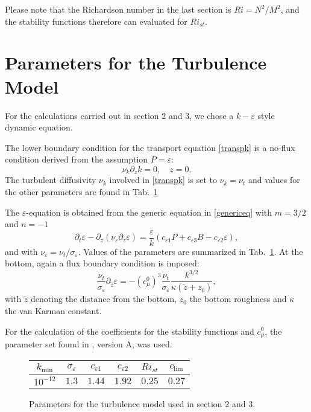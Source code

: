Please note that the Richardson number in the last section is $Ri = N^2 \slash 
M^2$, and the stability functions therefore can evaluated for $Ri_{st}$.

\section{Parameters for the Turbulence Model}

For the calculations carried out in section 2 and 3, we chose a $k-\varepsilon$ 
style dynamic equation.

The lower boundary condition for 
the transport equation \eqref{transpk} is a no-flux condition derived from the 
assumption $P=\varepsilon$:
\begin{equation}
 \label{lowerBC}
 \nu_k \partial_z k = 0, \quad z=0.
\end{equation}
The turbulent diffusivity $\nu_k$ involved in \eqref{transpk} is set to $\nu_k 
= \nu_t$ and values for the other parameters are found in Tab.\ \ref{tabellchen}

The $\varepsilon$-equation is obtained from the generic equation in 
\eqref{genericeq} with $m=3\slash 2$ and $n=-1$ 
\begin{equation}
 \label{transpeps}
 \partial_t \varepsilon - \partial_z ( \nu_\varepsilon \partial_z \varepsilon) 
= \frac{\varepsilon}{k} (c_{\varepsilon 1}P + c_{\varepsilon 3} B 
-c_{\varepsilon 2} \varepsilon),
\end{equation}
and with $\nu_\varepsilon = \nu_t \slash \sigma_\varepsilon$. Values of the 
parameters are summarized in Tab.\ \ref{tabellchen}. At the bottom, again a 
flux boundary condition is imposed:
\begin{equation}
 \label{epsBC}
 \frac{\nu_t}{\sigma_\varepsilon} \partial_{\tilde{z}} \varepsilon = - 
(c_\mu^0)^3  \frac{\nu_t}{\sigma_\varepsilon} \frac{k^{3 \slash 2}}{\kappa 
(\tilde{z} +z_0)},
\end{equation}
with $\tilde{z}$ denoting the distance from the bottom, $z_0$ the bottom 
roughness and $\kappa$ the van Karman constant.

For the calculation of the coefficients for the stability functions and 
$c_\mu^0$, the parameter set found in \cite{Canuto2001}, version A, was used.

\begin{figure}[ht]
\begin{tabular}{cccccc}
  $k_{\min}$ & $\sigma_\varepsilon$ & $c_{\varepsilon 1}$ & 
$c_{\varepsilon 2}$ & $Ri_{st}$ & $c_{\lim}$\\
\hline
$10^{-12}$ & $1.3$ & $1.44$ & $1.92$ & $0.25$ & $0.27$ \\
 \end{tabular}
\caption{Parameters for the turbulence model used in section 
2 and 3.}\label{tabellchen}
\end{figure}